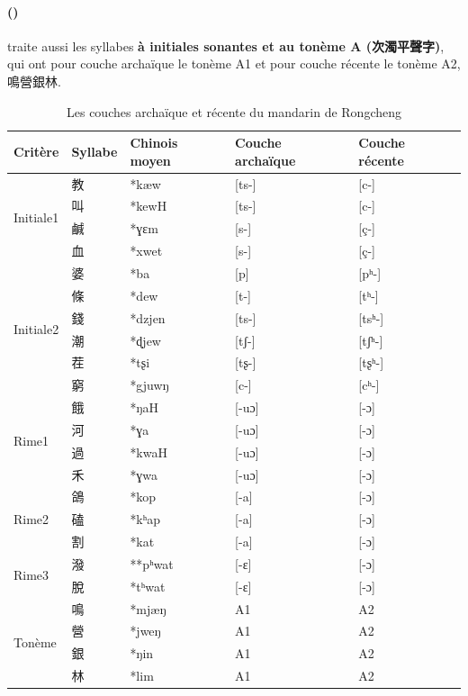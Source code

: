 \documentclass{scrbook}
\newcounter{c}[subsubsection]
\newcommand{\stpc}[1]{\stepcounter{#1}}
\newcommand{\difwenbai}{couches archaïque et récente\xspace}
\newcommand{\termyyx}[1]{\textbf{#1}}
\begin{document}
\begin{sloppypar}
\stpc{c}\paragraph{()}
\textcite[14--18]{Wang1995rongcheng} traite aussi les syllabes \termyyx{à initiales sonantes et au tonème A (次濁平聲字)}, qui ont pour couche archaïque le tonème A1 et pour couche récente le tonème A2, 鳴營銀林.

\begin{table}[htbp]
  \centering
    \begin{tabular}{lllll}
    \toprule
    Critère & Syllabe & Chinois moyen  & Couche archaïque & Couche récente \\
    \midrule
    \multirow{4}[2]{*}{Initiale1} & 教     & *kæw  & [ts-] & [c-] \\
          & 叫     & *kewH & [ts-] & [c-] \\
          & 鹹     & *ɣɛm  & [s-]  & [ç-] \\
          & 血     & *xwet & [s-]  & [ç-] \\
    \midrule
    \multirow{6}[2]{*}{Initiale2} & 婆     & *ba   & [p]   & [pʰ-] \\
          & 條     & *dew  & [t-]  & [tʰ-] \\
          & 錢     & *dzjen & [ts-] & [tsʰ-] \\
          & 潮     & *ɖjew & [tʃ-] & [tʃʰ-] \\
          & 茬     & *tʂi  & [tʂ-] & [tʂʰ-] \\
          & 窮     & *gjuwŋ & [c-]  & [cʰ-] \\
    \midrule
    \multirow{4}[2]{*}{Rime1} & 餓     & *ŋaH  & [-uɔ] & [-ɔ] \\
          & 河     & *ɣa   & [-uɔ] & [-ɔ] \\
          & 過     & *kwaH & [-uɔ] & [-ɔ] \\
          & 禾     & *ɣwa  & [-uɔ] & [-ɔ] \\
    \midrule
    \multirow{3}[2]{*}{Rime2} & 鴿     & *kop  & [-a]  & [-ɔ] \\
          & 磕     & *kʰap & [-a]  & [-ɔ] \\
          & 割     & *kat  & [-a]  & [-ɔ] \\
    \midrule
    \multirow{2}[2]{*}{Rime3} & 潑     & **pʰwat & [-ɛ]  & [-ɔ] \\
          & 脫     & *tʰwat & [-ɛ]  & [-ɔ] \\
    \midrule
    \multirow{4}[2]{*}{Tonème} & 鳴     & *mjæŋ & A1    & A2 \\
          & 營     & *jweŋ & A1    & A2 \\
          & 銀     & *ŋin  & A1    & A2 \\
          & 林     & *lim  & A1    & A2 \\
    \bottomrule
    \end{tabular}%
  \caption{Les \difwenbai du mandarin de Rongcheng}
  \label{tab:Rongcheng1}%
\end{table}%


\end{sloppypar}
\end{document}
